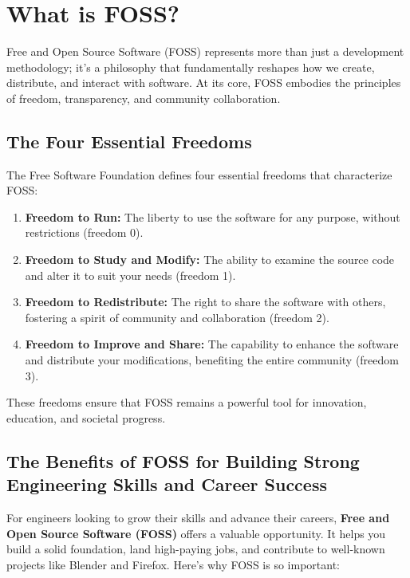 \documentclass[12pt,a4paper]{article}
\begin{document}
\section{What is FOSS?}

Free and Open Source Software (FOSS) represents more than just a development methodology; it's a philosophy that fundamentally reshapes how we create, distribute, and interact with software. At its core, FOSS embodies the principles of freedom, transparency, and community collaboration.

\subsection{The Four Essential Freedoms}

The Free Software Foundation defines four essential freedoms that characterize FOSS:

\begin{enumerate}
    \item \textbf{Freedom to Run:} The liberty to use the software for any purpose, without restrictions (freedom 0).
    \item \textbf{Freedom to Study and Modify:} The ability to examine the source code and alter it to suit your needs (freedom 1).
    \item \textbf{Freedom to Redistribute:} The right to share the software with others, fostering a spirit of community and collaboration (freedom 2).
    \item \textbf{Freedom to Improve and Share:} The capability to enhance the software and distribute your modifications, benefiting the entire community (freedom 3).
\end{enumerate}

These freedoms ensure that FOSS remains a powerful tool for innovation, education, and societal progress.

\subsection{The Benefits of FOSS for Building Strong Engineering Skills and Career Success}

For engineers looking to grow their skills and advance their careers, \textbf{Free and Open Source Software (FOSS)} offers a valuable opportunity. It helps you build a solid foundation, land high-paying jobs, and contribute to well-known projects like Blender and Firefox. Here’s why FOSS is so important:
\end{document}
